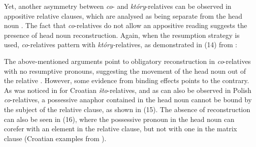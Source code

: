 \documentclass[output=paper]{langsci/langscibook}
\begin{document}
Yet, another asymmetry between \textit{co}{}- and \textit{który}{}-relatives can be observed in appositive relative clauses, which are analysed as being separate from the head noun \citep{Chierchia1990}. The fact that \textit{co}{}-relatives do not allow an appositive reading suggests the presence of head noun reconstruction. Again, when the resumption strategy is used, \textit{co}{}-relatives pattern with \textit{który-}relatives, as demonstrated in (14) from \citet[378]{Szczegielniak2006}:

\ea%
    \label{ex:leska:14}
    \z
\z

The above-mentioned arguments point to obligatory reconstruction in \textit{co}{}-relatives with no resumptive pronouns, suggesting the movement of the head noun out of the relative \citep{Åfarli1994,Bhatt2002,Bianchi1999,Brame1968,DeVries2002,Hornstein2000,Kayne1994,Safir1999,Schachter1973,Vergnaud1974,Zwart2000}. However, some evidence from binding effects points to the contrary. As was noticed in \citet{Gračanin-Yuksek2013} for Croatian \textit{što}{}-relatives, and as can also be observed in Polish \textit{co}{}-relatives, a possessive anaphor contained in the head noun cannot be bound by the subject of the relative clause, as shown in (15). The absence of reconstruction can also be seen in (16), where the possessive pronoun in the head noun can corefer with an element in the relative clause, but not with one in the matrix clause (Croatian examples from \citealt{Gračanin-Yuksek2013}).
\end{document}
